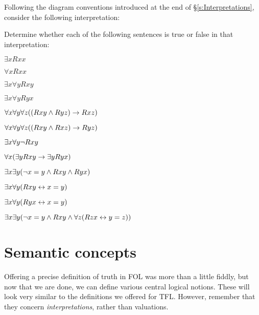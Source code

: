 \problempart
\label{pr.TorF3}
Following the diagram conventions introduced at the end of \S\ref{s:Interpretations}, consider the following interpretation:	
\begin{center}
\end{center}
Determine whether each of the following sentences is true or false in that interpretation:
\begin{earg}
\item $\exists x Rxx$
\item $\forall x Rxx$
\item $\exists x \forall y Rxy$
\item $\exists x \forall y Ryx$
\item $\forall x \forall y \forall z ((Rxy \wedge Ryz) \rightarrow Rxz)$
\item $\forall x \forall y \forall z ((Rxy \wedge Rxz) \rightarrow Ryz)$
\item $\exists x \forall y \neg Rxy$
\item $\forall x(\exists y Rxy \rightarrow \exists y Ryx)$
\item $\exists x \exists y (\neg x = y \wedge Rxy \wedge Ryx)$
\item $\exists x \forall y(Rxy \leftrightarrow x = y)$
\item $\exists x \forall y(Ryx \leftrightarrow x = y)$
\item $\exists x \exists y(\neg x = y \wedge Rxy \wedge \forall z(Rzx \leftrightarrow y = z))$
\end{earg}


\chapter{Semantic concepts}
Offering a precise definition of truth in FOL was more than a little fiddly, but now that we are done, we can define various central logical notions. These will look very similar to the definitions we offered for TFL. However, remember that they concern \emph{interpretations}, rather than valuations. 


